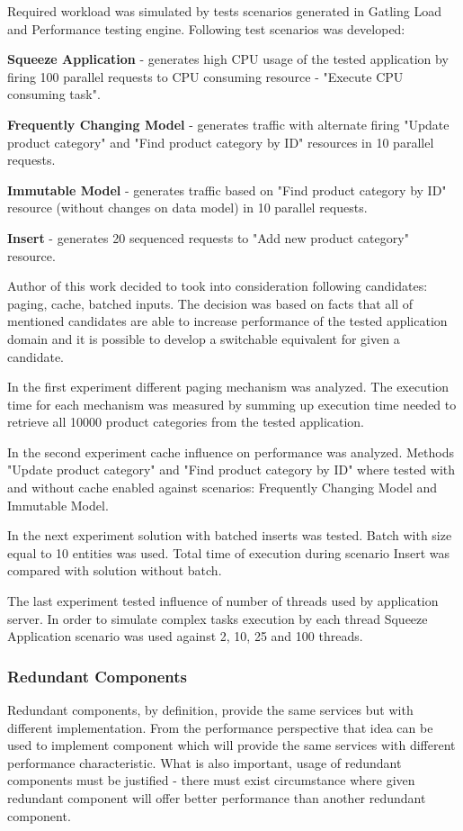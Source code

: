 \documentclass[12pt,a4paper]{article}
\let\tempone\itemize
\let\temptwo\enditemize
\renewenvironment{itemize}{\tempone\addtolength{\itemsep}{-0.4\baselineskip}}{\temptwo}
\begin{document}
Required workload was simulated by tests scenarios generated in Gatling Load and Performance testing engine\cite{gatling}. Following test scenarios was developed:
\begin{itemize}
\item \textbf{Squeeze Application} - generates high CPU usage of the tested application by firing 100 parallel requests to CPU consuming resource - "Execute CPU consuming task". 
\item \textbf{Frequently Changing Model} - generates traffic with alternate firing  "Update product category" and "Find product category by ID" resources in 10 parallel requests.
\item \textbf{Immutable Model} - generates traffic based on "Find product category by ID" resource (without changes on data model) in 10 parallel requests.
\item \textbf{Insert} - generates 20 sequenced requests to "Add new product category" resource. 
\end{itemize}

Author of this work decided to took into consideration following candidates: paging, cache, batched inputs. The decision was based on facts that all of mentioned candidates are able to increase performance of the  tested application domain and it is possible to develop a switchable equivalent for given a candidate. 

In the first experiment different paging mechanism was analyzed. The execution time for each mechanism was measured by summing up execution time needed to retrieve all 10000 product categories from the tested application.   

In the second experiment cache influence on performance was analyzed. Methods "Update product category" and "Find product category by ID" where tested with and without cache enabled against scenarios: Frequently Changing Model and    Immutable Model. 

In the next experiment solution with batched inserts was tested. Batch with size equal to 10 entities was used. Total time of execution during scenario Insert was compared with solution without batch. 

The last experiment tested influence of number of threads used by application server. In order to simulate complex tasks execution by each thread Squeeze Application scenario was used against 2, 10, 25 and 100 threads. 

\subsubsection{Redundant Components}
Redundant components, by definition, provide the same services but with different implementation. From the performance perspective that idea can be used to implement component which will provide the same services with different performance characteristic. What is also important, usage of redundant components must be justified - there must exist circumstance where given redundant component will offer better performance than another redundant component. 
\end{document}
